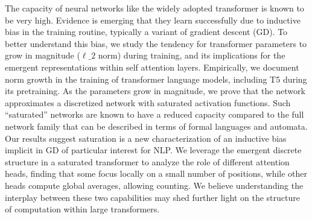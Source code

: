 The capacity of neural networks like the widely adopted transformer is known to be very high. Evidence is emerging that they learn successfully due to inductive bias in the training routine, typically a variant of gradient descent (GD). To better understand this bias, we study the tendency for transformer parameters to grow in magnitude ($\ell\_2$ norm) during training, and its implications for the emergent representations within self attention layers. Empirically, we document norm growth in the training of transformer language models, including T5 during its pretraining. As the parameters grow in magnitude, we prove that the network approximates a discretized network with saturated activation functions. Such ``saturated'' networks are known to have a reduced capacity compared to the full network family that can be described in terms of formal languages and automata. Our results suggest saturation is a new characterization of an inductive bias implicit in GD of particular interest for NLP. We leverage the emergent discrete structure in a saturated transformer to analyze the role of different attention heads, finding that some focus locally on a small number of positions, while other heads compute global averages, allowing counting. We believe understanding the interplay between these two capabilities may shed further light on the structure of computation within large transformers.
